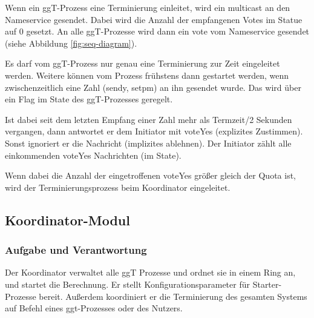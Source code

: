 \documentclass{article}
\begin{document}
Wenn ein ggT-Prozess eine Terminierung einleitet, wird ein multicast an den Nameservice gesendet. Dabei wird die Anzahl
der empfangenen Votes im Statue auf 0 gesetzt. An alle ggT-Prozesse wird dann ein vote vom Nameservice gesendet (siehe
Abbildung \ref{fig:seq-diagram}).

Es darf vom ggT-Prozess nur genau eine Terminierung zur Zeit eingeleitet werden. Weitere können vom Prozess frühstens
dann gestartet werden, wenn zwischenzeitlich eine Zahl (sendy, setpm) an ihn gesendet wurde. Das wird über ein Flag im
State des ggT-Prozesses geregelt.

Ist dabei seit dem letzten Empfang einer Zahl mehr als Termzeit/2 Sekunden vergangen, dann antwortet er dem Initiator
mit voteYes (explizites Zustimmen). Sonst ignoriert er die Nachricht (implizites ablehnen). Der Initiator zählt alle
einkommenden voteYes Nachrichten (im State).

Wenn dabei die Anzahl der eingetroffenen voteYes größer gleich der Quota ist, wird der Terminierungsprozess beim
Koordinator eingeleitet.
\newpage

\subsection{Koordinator-Modul}
\subsubsection{Aufgabe und Verantwortung}
Der Koordinator verwaltet alle ggT Prozesse und ordnet sie in einem Ring an, und startet die Berechnung.
Er stellt Konfigurationsparameter für Starter-Prozesse bereit. Außerdem koordiniert er die Terminierung des
gesamten Systems auf Befehl eines ggt-Prozesses oder des Nutzers.
\end{document}
